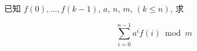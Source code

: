 已知 \(f(0),\dots,f(k-1)\), \(a\), \(n\), \(m\), \((k\leq n)\), 求

\[
    \sum_{i=0}^{n-1} a^i f(i)\bmod{m}
\]